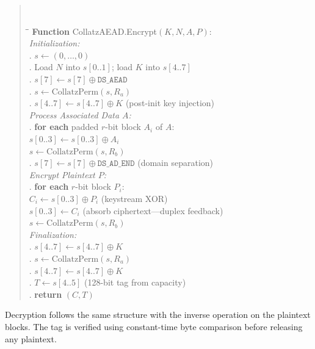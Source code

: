 \documentclass[11pt,a4paper]{article}
\begin{document}
\begin{quote}\tt
\begin{tabbing}
\hspace{2em}\=\hspace{2em}\=\kill
\textrm{\textbf{Function}} CollatzAEAD.Encrypt$(K, N, A, P)$:\\[4pt]
\textrm{\textit{Initialization:}}\\
. $s \leftarrow (0, \ldots, 0)$\\
. Load $N$ into $s[0..1]$; load $K$ into $s[4..7]$\\
. $s[7] \leftarrow s[7] \oplus \mathtt{DS\_AEAD}$\\
. $s \leftarrow \mathrm{CollatzPerm}(s, R_a)$\\
. $s[4..7] \leftarrow s[4..7] \oplus K$ \textrm{\small (post-init key injection)}\\[4pt]
\textrm{\textit{Process Associated Data $A$:}}\\
. \textbf{for each} padded $r$-bit block $A_i$ of $A$:\\
\> \> $s[0..3] \leftarrow s[0..3] \oplus A_i$\\
\> \> $s \leftarrow \mathrm{CollatzPerm}(s, R_b)$\\
. $s[7] \leftarrow s[7] \oplus \mathtt{DS\_AD\_END}$ \textrm{\small (domain separation)}\\[4pt]
\textrm{\textit{Encrypt Plaintext $P$:}}\\
. \textbf{for each} $r$-bit block $P_i$:\\
\> \> $C_i \leftarrow s[0..3] \oplus P_i$ \textrm{\small (keystream XOR)}\\
\> \> $s[0..3] \leftarrow C_i$ \textrm{\small (absorb ciphertext---duplex feedback)}\\
\> \> $s \leftarrow \mathrm{CollatzPerm}(s, R_b)$\\[4pt]
\textrm{\textit{Finalization:}}\\
. $s[4..7] \leftarrow s[4..7] \oplus K$\\
. $s \leftarrow \mathrm{CollatzPerm}(s, R_a)$\\
. $s[4..7] \leftarrow s[4..7] \oplus K$\\
. $T \leftarrow s[4..5]$ \textrm{\small (128-bit tag from capacity)}\\
. \textbf{return} $(C, T)$
\end{tabbing}
\end{quote}

Decryption follows the same structure with the inverse operation on the
plaintext blocks. The tag is verified using constant-time byte comparison
before releasing any plaintext.
\end{document}

